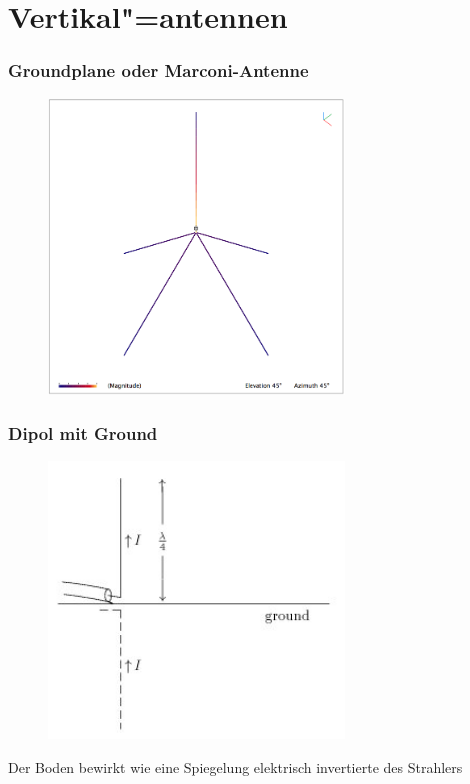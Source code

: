 \section*{Vertikal"=antennen}

\begin{frame}
  \frametitle{Groundplane oder Marconi-Antenne}
  \begin{center}
    \begin{figure}
      \includegraphics[width=0.7\textwidth,height=.75\textheight,keepaspectratio]{a09/GP-DB4UM.png}
    \end{figure}
  \end{center}
\end{frame}

\begin{frame}
  \frametitle{Dipol mit Ground}
  \begin{center}
    \begin{figure}
      \includegraphics[width=0.7\textwidth,height=.7\textheight,keepaspectratio]{a09/A6-3EN.jpg}
    \end{figure}
    Der Boden bewirkt wie eine Spiegelung elektrisch invertierte des Strahlers
  \end{center}
\end{frame}

